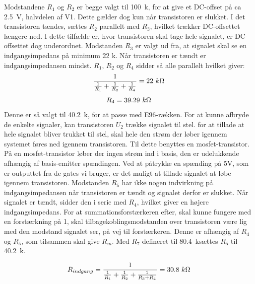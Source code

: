 Modstandene $R_1$ og $R_2$ er begge valgt til 100~k\ohm, for at give et DC-offset på ca 2.5~V, halvdelen af V1. Dette gælder dog kun når transistoren er slukket. I det transistoren tændes, sættes $R_2$ parallelt med $R_3$, hvilket trækker DC-offsettet længere ned.
I dette tilfælde er, hvor transistoren skal tage hele signalet, er DC-offsettet dog underordnet. 
Modstanden $R_3$ er valgt ud fra, at signalet skal se en indgangsimpedans på minimum 22 k\ohm. Når transistoren er tændt er indgangsimpedansen mindst. $R_1$, $R_2$ og $R_4$ sidder så alle parallelt hvilket giver:
\begin{equation}
\frac{1}{\frac{1}{R_1}+\frac{1}{R_2}+\frac{1}{R_4}}=22~k\ohm
\end{equation}
\begin{equation}
R_4=39.29~k\ohm
\end{equation}
Denne er så valgt til 40.2~k\ohm, for at passe med E96-rækken.
For at kunne afbryde de enkelte signaler, kan transistoren $U_2$ trække signalet til stel. for at tillade at hele signalet bliver trukket til stel, skal hele den strøm der løber igennem systemet føres ned igennem transistoren. Til dette benyttes en mosfet-transistor. På en mosfet-transistor løber der ingen strøm ind i basis, den er udelukkende afhængig af basis-emitter spændingen. Ved at påtrykke en spænding på 5V, som er outputtet fra de gates vi bruger, er det muligt at tillade signalet at løbe igennem transistoren.
Modstanden $R_5$ har ikke nogen indvirkning på indgangsimpedansen når transistoren er tændt og signalet derfor er slukket. Når signalet er tændt, sidder den i serie med $R_4$, hvilket giver en højere indgangsimpedans. For at summationsforstærkeren efter, skal kunne fungere med en forstærkning på 1, skal tilbagekoblingsmodstanden over transistoren være lig med den modstand signalet ser, på vej til forstærkeren. Denne er afhængig af $R_4$ og $R_5$, som tilsammen skal give $R_m$. Med $R_7$ defineret til 80.4~k\ohm sættes $R_5$ til 40.2~k\ohm .

\begin{equation}
R_{indgang}=\frac{1}{\frac{1}{R_1}+\frac{1}{R_2}+\frac{1}{R_3+R_4}}=30.8~k\ohm
\end{equation}

